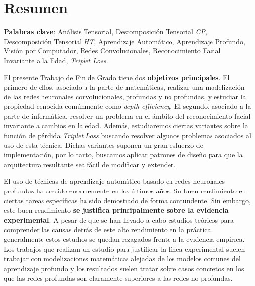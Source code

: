 %



\chapter{Resumen}

\textbf{Palabras clave}: Análisis Tensorial, Descomposición Tensorial \textit{CP}, Descomposición Tensorial \textit{HT}, Aprendizaje Automático, Aprendizaje Profundo, Visión por Computador, Redes Convolucionales, Reconocimiento Facial Invariante a la Edad, \textit{Triplet Loss}.

El presente Trabajo de Fin de Grado tiene dos \textbf{objetivos principales}. El primero de ellos, asociado a la parte de matemáticas, realizar una modelización de las redes neuronales convolucionales, profundas y no profundas, y estudiar la propiedad conocida comúnmente como \textit{depth efficiency}. El segundo, asociado a la parte de informática, resolver un problema en el ámbito del reconocimiento facial invariante a cambios en la edad. Además, estudiaremos ciertas variantes sobre la función de pérdida \textit{Triplet Loss} buscando resolver algunos problemas asociados al uso de esta técnica. Dichas variantes suponen un gran esfuerzo de implementación, por lo tanto, buscamos aplicar patrones de diseño para que la arquitectura resultante sea fácil de modificar y extender.

El uso de técnicas de aprendizaje automático basado en redes neuronales profundas ha crecido enormemente en los últimos años. Su buen rendimiento en ciertas tareas específicas ha sido demostrado de forma contundente. Sin embargo, este buen rendimiento \textbf{se justifica principalmente sobre la evidencia experimental}. A pesar de que se han llevado a cabo estudios teóricos para comprender las causas detrás de este alto rendimiento en la práctica, generalmente estos estudios se quedan rezagados frente a la evidencia empírica. Los trabajos que realizan un estudio para justificar la línea experimental suelen trabajar con modelizaciones matemáticas alejadas de los modelos comunes del aprendizaje profundo y los resultados suelen tratar sobre casos concretos en los que las redes profundas son claramente superiores a las redes no profundas.

